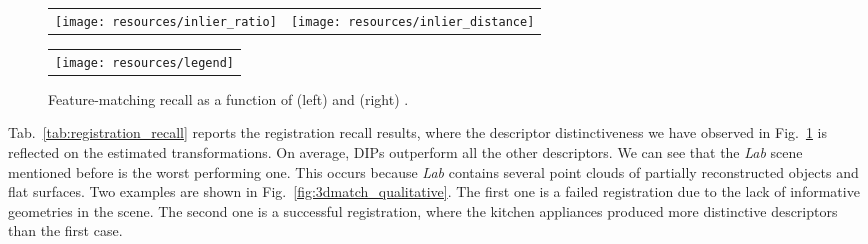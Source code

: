 \documentclass[a4paper,conference]{IEEEtran}
\begin{document}
\begin{figure}[t]
\begin{center}
  \begin{tabular}{@{}c@{}c}
      \texttt{[image: resources/inlier\_ratio]}&
      \texttt{[image: resources/inlier\_distance]}
  \end{tabular}
\begin{tabular}{@{}c}
    \texttt{[image: resources/legend]}
  \end{tabular}
\end{center}
\vspace{-.3cm}
\caption{Feature-matching recall as a function of (left)  and (right) .}
\label{fig:inlier_graphs}
\end{figure}


Tab.~\ref{tab:registration_recall} reports the registration recall results, where the descriptor distinctiveness we have observed in Fig.~\ref{fig:inlier_graphs} is reflected on the estimated transformations.
On average, DIPs outperform all the other descriptors.
We can see that the \emph{Lab} scene mentioned before is the worst performing one.
This occurs because \emph{Lab} contains several point clouds of partially reconstructed objects and flat surfaces.
Two examples are shown in Fig.~\ref{fig:3dmatch_qualitative}.
The first one is a failed registration due to the lack of informative geometries in the scene.
The second one is a successful registration, where the kitchen appliances produced more distinctive descriptors than the first case.

\begin{table}[t]
    \tabcolsep 1pt
    \caption{Registration recall on the 3DMatch dataset \cite{Zeng2017}.}
    \vspace{-.2cm}
    \label{tab:registration_recall}
\end{table}
\end{document}

